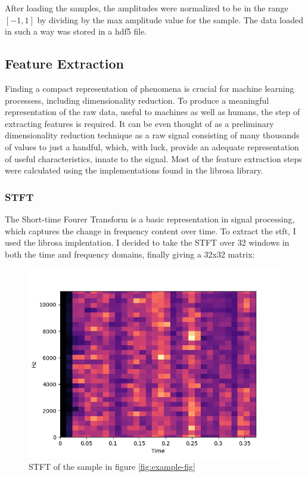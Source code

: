 \documentclass[11pt]{article}
\begin{document}
After loading the samples, the amplitudes were normalized to be in the range \([-1, 1]\) by dividing by the max amplitude value for the sample. The data loaded in such a way was stored in a hdf5 file.

\subsection{Feature Extraction}
\label{sec:org8d85bd5}

Finding a compact representation of phenomena is crucial for machine learning processess, including dimensionality reduction. To produce a meaningful representation of the raw data, useful to machines as well as humans, the step of extracting features is required. It can be even thought of as a preliminary dimensionality reduction technique as a raw signal consisting of many thousands of values to just a handful, which, with luck, provide an adequate representation of useful characteristics, innate to the signal. Most of the feature extraction steps were calculated using the implementations found in the librosa library.


\subsubsection{STFT}
\label{sec:org0c9e9c5}

The Short-time Fourer Transform is a basic representation in signal processing, which captures the change in frequency content over time.
To extract the stft, I used the librosa implentation. I decided to take the STFT over 32 windows in both the time and frequency domains, finally giving a 32x32 matrix:

\begin{figure}[H]
\centering
\includegraphics[width=.7\linewidth]{./Figures/stft.png}
\caption{STFT of the sample in figure \ref{fig:example-fig}}
\end{figure}
\end{document}
